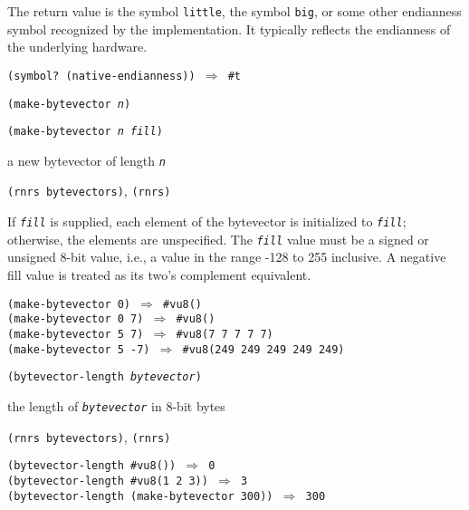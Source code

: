 The return value is the symbol \texttt{little}, the symbol \texttt{big},
or some other endianness symbol recognized by the implementation.
It typically reflects the endianness of the underlying hardware.


\texttt{(symbol? (native-endianness)) \(\Rightarrow\) \#{}t}
\begin{description}

\label{objects_s242}\item[procedure] \texttt{(make-bytevector \textit{n})}



\item[procedure] \texttt{(make-bytevector \textit{n} \textit{fill})}



\item[returns] a new bytevector of length \texttt{\textit{n}}


\item[libraries] \texttt{(rnrs bytevectors)}, \texttt{(rnrs)}
\end{description}


If \texttt{\textit{fill}} is supplied, each element of the bytevector is initialized
to \texttt{\textit{fill}}; otherwise, the elements are unspecified.
The \texttt{\textit{fill}} value must be a signed or unsigned 8-bit value, i.e.,
a value in the range -128 to 255 inclusive.
A negative fill value is treated as its two's complement equivalent.


\begin{alltt}
(make-bytevector 0) \(\Rightarrow\) \#{}vu8()
(make-bytevector 0 7) \(\Rightarrow\) \#{}vu8()
(make-bytevector 5 7) \(\Rightarrow\) \#{}vu8(7 7 7 7 7)
(make-bytevector 5 -7) \(\Rightarrow\) \#{}vu8(249 249 249 249 249)
\end{alltt}

\begin{description}

\label{objects_s243}\item[procedure] \texttt{(bytevector-length \textit{bytevector})}



\item[returns] the length of \texttt{\textit{bytevector}} in 8-bit bytes


\item[libraries] \texttt{(rnrs bytevectors)}, \texttt{(rnrs)}
\end{description}


\begin{alltt}
(bytevector-length \#{}vu8()) \(\Rightarrow\) 0
(bytevector-length \#{}vu8(1 2 3)) \(\Rightarrow\) 3
(bytevector-length (make-bytevector 300)) \(\Rightarrow\) 300
\end{alltt}

